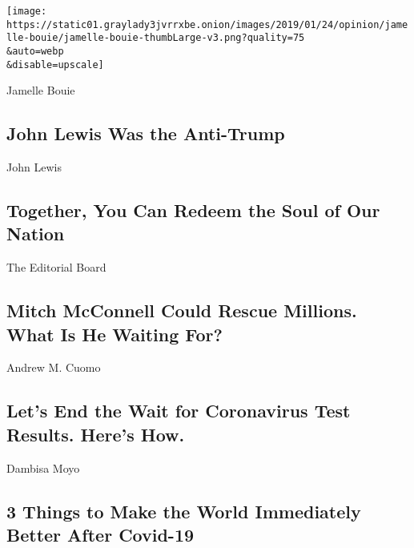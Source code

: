 \href{/2020/07/31/opinion/john-lewis-trump-election-2020.html}{}

\texttt{[image: https://static01.graylady3jvrrxbe.onion/images/2019/01/24/opinion/jamelle-bouie/jamelle-bouie-thumbLarge-v3.png?quality=75\\\&auto=webp\\\&disable=upscale]}

Jamelle Bouie

\hypertarget{john-lewis-was-the-anti-trump}{%
\subsection{John Lewis Was the
Anti-Trump}\label{john-lewis-was-the-anti-trump}}

\href{/2020/07/30/opinion/john-lewis-civil-rights-america.html}{}

John Lewis

\hypertarget{together-you-can-redeem-the-soul-of-our-nation}{%
\subsection{Together, You Can Redeem the Soul of Our
Nation}\label{together-you-can-redeem-the-soul-of-our-nation}}

\href{/2020/07/30/opinion/mitch-mcconnell-coronavirus-economy.html}{}

The Editorial Board

\hypertarget{mitch-mcconnell-could-rescue-millions-what-is-he-waiting-for}{%
\subsection{Mitch McConnell Could Rescue Millions. What Is He Waiting
For?}\label{mitch-mcconnell-could-rescue-millions-what-is-he-waiting-for}}

\href{/2020/07/31/opinion/coronavirus-testing-cuomo.html}{}

Andrew M. Cuomo

\hypertarget{lets-end-the-wait-for-coronavirus-test-results-heres-how}{%
\subsection{Let's End the Wait for Coronavirus Test Results. Here's
How.}\label{lets-end-the-wait-for-coronavirus-test-results-heres-how}}

\href{/2020/07/31/opinion/coronavirus-economy.html}{}

Dambisa Moyo

\hypertarget{3-things-to-make-the-world-immediately-better-after-covid-19}{%
\subsection{3 Things to Make the World Immediately Better After
Covid-19}\label{3-things-to-make-the-world-immediately-better-after-covid-19}}

